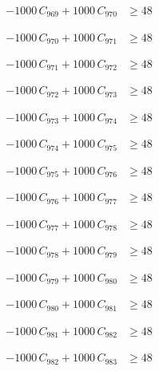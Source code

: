 \documentclass[a4paper,11pt]{article}
\begin{document}
\begin{align}
-1000\,C_{969} + 1000\,C_{970} &\geq 48 \nonumber
\end{align}

\begin{align}
-1000\,C_{970} + 1000\,C_{971} &\geq 48 \nonumber
\end{align}

\begin{align}
-1000\,C_{971} + 1000\,C_{972} &\geq 48 \nonumber
\end{align}

\begin{align}
-1000\,C_{972} + 1000\,C_{973} &\geq 48 \nonumber
\end{align}

\begin{align}
-1000\,C_{973} + 1000\,C_{974} &\geq 48 \nonumber
\end{align}

\begin{align}
-1000\,C_{974} + 1000\,C_{975} &\geq 48 \nonumber
\end{align}

\begin{align}
-1000\,C_{975} + 1000\,C_{976} &\geq 48 \nonumber
\end{align}

\begin{align}
-1000\,C_{976} + 1000\,C_{977} &\geq 48 \nonumber
\end{align}

\begin{align}
-1000\,C_{977} + 1000\,C_{978} &\geq 48 \nonumber
\end{align}

\begin{align}
-1000\,C_{978} + 1000\,C_{979} &\geq 48 \nonumber
\end{align}

\begin{align}
-1000\,C_{979} + 1000\,C_{980} &\geq 48 \nonumber
\end{align}

\begin{align}
-1000\,C_{980} + 1000\,C_{981} &\geq 48 \nonumber
\end{align}

\begin{align}
-1000\,C_{981} + 1000\,C_{982} &\geq 48 \nonumber
\end{align}

\begin{align}
-1000\,C_{982} + 1000\,C_{983} &\geq 48 \nonumber
\end{align}
\end{document}
